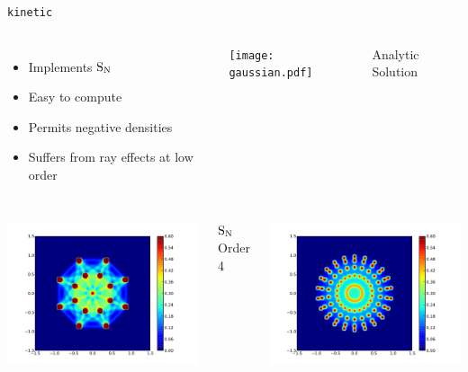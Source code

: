 \documentclass{beamer}
\newcommand{\SN}{\ensuremath{\textnormal{S}_\textnormal{N}}\xspace}
\newcommand{\kinetic}{\texttt{kinetic}\xspace}
\begin{document}
    \begin{frame}{\kinetic}
        \begin{columns}
            \begin{itemize}
                \item Implements \SN
                \item Easy to compute
                \item Permits negative densities
                \item Suffers from ray effects at low order
            \end{itemize}

            \centering
            \texttt{[image: gaussian.pdf]}

            Analytic Solution
        \end{columns}

        \vfill

        \begin{columns}
            \centering
            \includegraphics[width=\textwidth]{S04-400.pdf}

            \SN Order 4

            \centering
            \includegraphics[width=\textwidth]{S11-400.pdf}


\end{columns}
\end{frame}
\end{document}
